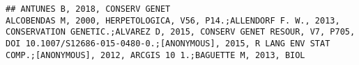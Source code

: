 \documentclass[]{article}
\begin{document}
\begin{verbatim}
## ANTUNES B, 2018, CONSERV GENET                                                                                                                                                                                                                                                                                                                                                                                                                                                                                                                                                                                                                                                                                                                                                                                                                                                                                                                                                                                                                                                                                                                                                                                                                                                                                                                                                                                                                                                                                                                                                                                                                                                                                                                                                                                                                                                                                                                                                                                                                                                                                                                                                                                                                                                                                                                                                                                                                                                                                                                                                                                                                                                                                                                                                                                                                                                                                                                                                                                                                                                                                                                                         ALCOBENDAS M, 2000, HERPETOLOGICA, V56, P14.;ALLENDORF F. W., 2013, CONSERVATION GENETIC.;ALVAREZ D, 2015, CONSERV GENET RESOUR, V7, P705, DOI 10.1007/S12686-015-0480-0.;[ANONYMOUS], 2015, R LANG ENV STAT COMP.;[ANONYMOUS], 2012, ARCGIS 10 1.;BAGUETTE M, 2013, BIOL 
\end{verbatim}
\end{document}
